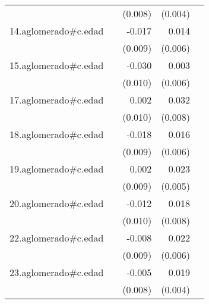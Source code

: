 {\begin{longtable}{l*{4}{D{.}{.}{-1}}}
            &                     &     (0.008)         &     (0.004)         &                     \\
\addlinespace
14.aglomerado#c.edad&                     &      -0.017         &       0.014\sym{*}  &                     \\
            &                     &     (0.009)         &     (0.006)         &                     \\
\addlinespace
15.aglomerado#c.edad&                     &      -0.030\sym{**} &       0.003         &                     \\
            &                     &     (0.010)         &     (0.006)         &                     \\
\addlinespace
17.aglomerado#c.edad&                     &       0.002         &       0.032\sym{***}&                     \\
            &                     &     (0.010)         &     (0.008)         &                     \\
\addlinespace
18.aglomerado#c.edad&                     &      -0.018         &       0.016\sym{*}  &                     \\
            &                     &     (0.009)         &     (0.006)         &                     \\
\addlinespace
19.aglomerado#c.edad&                     &       0.002         &       0.023\sym{***}&                     \\
            &                     &     (0.009)         &     (0.005)         &                     \\
\addlinespace
20.aglomerado#c.edad&                     &      -0.012         &       0.018\sym{*}  &                     \\
            &                     &     (0.010)         &     (0.008)         &                     \\
\addlinespace
22.aglomerado#c.edad&                     &      -0.008         &       0.022\sym{***}&                     \\
            &                     &     (0.009)         &     (0.006)         &                     \\
\addlinespace
23.aglomerado#c.edad&                     &      -0.005         &       0.019\sym{***}&                     \\
            &                     &     (0.008)         &     (0.004)         &                     \\

\end{longtable}}

